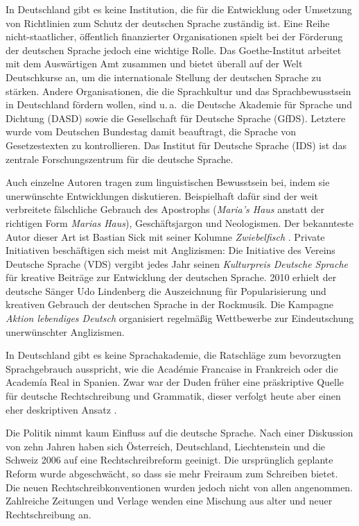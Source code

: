 \begin{multicols}{2}
In Deutschland gibt es keine Institution, die für die Entwicklung oder Umsetzung von Richtlinien zum Schutz der deutschen Sprache zuständig ist. Eine Reihe nicht-staat\-licher, öffentlich finanzierter Organisationen spielt bei der Förderung der deutschen Sprache jedoch eine wichtige Rolle. Das Goethe-In\-sti\-tut arbeitet mit dem Auswärtigen Amt zusammen und bietet überall auf der Welt Deutschkurse an, um die internationale Stellung der deutschen Sprache zu stärken. Andere Organisationen, 
die die Sprachkultur und das Sprachbewusstsein in Deutschland fördern wollen, 
sind u.\,a.~die Deutsche Akademie für Sprache und Dichtung (DASD) sowie die Gesellschaft für Deutsche Sprache (GfDS). Letztere wurde vom Deutschen Bundestag damit beauftragt, die Sprache von Gesetzestexten zu kontrollieren. Das Institut für Deutsche Sprache (IDS) ist das zentrale Forschungszentrum für die deutsche Sprache. 

Auch einzelne Autoren tragen zum linguistischen Bewusstsein bei, indem sie unerwünschte Entwicklungen diskutieren. Beispielhaft dafür sind der weit verbreitete fälschliche Gebrauch des Apostrophs (\textit{Maria’s Haus} anstatt der richtigen Form \textit{Marias Haus}), Geschäftsjargon und Neologismen. Der bekannteste Autor dieser Art ist Bastian Sick \cite{Sick1} mit seiner Kolumne \textit{Zwiebelfisch} \cite{Sick2}. Private Initiativen beschäftigen sich meist mit Anglizismen: Die Initiative des Vereins Deutsche Sprache (VDS) vergibt jedes Jahr seinen \textit{Kulturpreis Deutsche Sprache} für kreative Beiträge zur Entwicklung der deutschen Sprache. 2010 erhielt der deutsche Sänger Udo Lindenberg die Auszeichnung für Popularisierung und kreativen Gebrauch der deutschen Sprache in der Rockmusik. 
Die Kampagne \textit{Aktion lebendiges Deutsch} organisiert regelmäßig Wettbewerbe zur Eindeutschung unerwünschter Anglizismen. 

In Deutschland gibt es keine Sprachakademie, die Ratschläge zum bevorzugten Sprachgebrauch ausspricht, wie die Académie Francaise in Frankreich oder die Academía Real in Spanien. Zwar war der Duden früher eine präskriptive Quelle für deutsche Rechtschreibung und Grammatik, dieser verfolgt heute aber einen eher deskriptiven Ansatz \cite{Schn1}. 


Die Politik nimmt kaum Einfluss auf die deutsche Sprache. Nach einer Diskussion von zehn Jahren haben sich Österreich, Deutschland, Liechtenstein und die Schweiz 2006 auf eine Rechtschreibreform geeinigt. Die ursprünglich geplante Reform wurde abgeschwächt, so dass sie mehr Freiraum zum Schreiben bietet. Die neuen Rechtschreibkonventionen wurden jedoch nicht von allen angenommen. Zahlreiche Zeitungen und Verlage wenden eine Mischung aus alter und neuer Rechtschreibung an.


\end{multicols}
